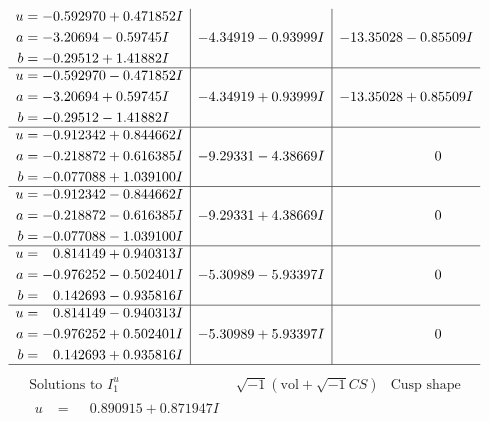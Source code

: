 \documentclass[1p]{elsarticle_modified}
\theoremstyle{definition}
\newcommand{\I}{\sqrt{-1}}
\begin{document}
$$\begin{array}{c|c|c}
\begin{aligned}
u &= -0.592970 + 0.471852 I \\
a &= -3.20694 - 0.59745 I \\
b &= -0.29512 + 1.41882 I\end{aligned}
 & -4.34919 - 0.93999 I & -13.35028 - 0.85509 I \\ \hline\begin{aligned}
u &= -0.592970 - 0.471852 I \\
a &= -3.20694 + 0.59745 I \\
b &= -0.29512 - 1.41882 I\end{aligned}
 & -4.34919 + 0.93999 I & -13.35028 + 0.85509 I \\ \hline\begin{aligned}
u &= -0.912342 + 0.844662 I \\
a &= -0.218872 + 0.616385 I \\
b &= -0.077088 + 1.039100 I\end{aligned}
 & -9.29331 - 4.38669 I & \phantom{-0.000000 } 0 \\ \hline\begin{aligned}
u &= -0.912342 - 0.844662 I \\
a &= -0.218872 - 0.616385 I \\
b &= -0.077088 - 1.039100 I\end{aligned}
 & -9.29331 + 4.38669 I & \phantom{-0.000000 } 0 \\ \hline\begin{aligned}
u &= \phantom{-}0.814149 + 0.940313 I \\
a &= -0.976252 - 0.502401 I \\
b &= \phantom{-}0.142693 - 0.935816 I\end{aligned}
 & -5.30989 - 5.93397 I & \phantom{-0.000000 } 0 \\ \hline\begin{aligned}
u &= \phantom{-}0.814149 - 0.940313 I \\
a &= -0.976252 + 0.502401 I \\
b &= \phantom{-}0.142693 + 0.935816 I\end{aligned}
 & -5.30989 + 5.93397 I & \phantom{-0.000000 } 0\\
 \hline 
 \end{array}$$\newpage$$\begin{array}{c|c|c}  
\text{Solutions to }I^u_{1}& \I (\text{vol} + \sqrt{-1}CS) & \text{Cusp shape}\\
 \hline 
\begin{aligned}
u &= \phantom{-}0.890915 + 0.871947 I \\

\end{aligned}
\end{array}$$
\end{document}
